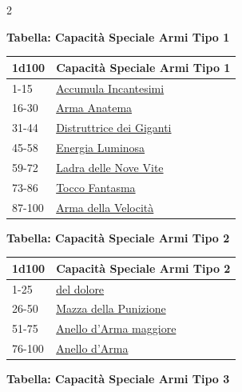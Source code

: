 \begin{multicols}{2}
{\textbf{Tabella: Capacità Speciale Armi Tipo 1}\hypertarget{Capacità Speciale Armi Tipo 1}{}

\medskip

{\small \begin{tabularx}{\linewidth}{ll}
		\toprule
\rowcolor{gray!20}\textbf{1d100} & \textbf{Capacità Speciale Armi Tipo 1}\\
\toprule
1-15 &\hyperlink{Accumula Incantesimi}{Accumula Incantesimi}\\
\rowcolor{gray!20}16-30 &\hyperlink{Arma Anatema}{Arma Anatema}\\
31-44 & \hyperlink{Distruttrice dei Giganti}{Distruttrice dei Giganti}\\
\rowcolor{gray!20}45-58 & \hyperlink{Energia Luminosa}{Energia Luminosa}\\
59-72 & \hyperlink{Ladra delle Nove Vite}{Ladra delle Nove Vite}\\
\rowcolor{gray!20}73-86 & \hyperlink{Tocco Fantasma}{Tocco Fantasma}\\
87-100 & \hyperlink{Arma della Velocità}{Arma della Velocità}\\
\end{tabularx}
}
\medskip


\textbf{Tabella: Capacità Speciale Armi Tipo 2}\hypertarget{Capacità Speciale Armi Tipo 2}{}

\medskip
{\small \begin{tabularx}{\linewidth}{ll}
		\toprule
\rowcolor{gray!20}\textbf{1d100} & \textbf{Capacità Speciale Armi Tipo 2}\\
\toprule
1-25 & \hyperlink{Del Dolore}{del dolore}\\
\rowcolor{gray!20}26-50 & \hyperlink{Mazza della Punizione}{Mazza della Punizione}\\
51-75 & \hyperlink{Anello d'Arma maggiore}{Anello d'Arma maggiore}\\
\rowcolor{gray!20}76-100 & \hyperlink{Anello d'Arma}{Anello d'Arma}\\
\end{tabularx}}

\medskip

\textbf{Tabella: Capacità Speciale Armi Tipo 3}\hypertarget{Capacità Speciale Armi Tipo 3}{}

}
\end{multicols}
